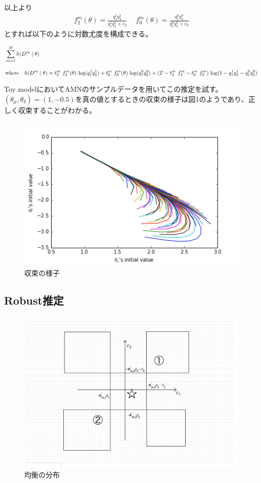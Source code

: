 \documentclass{jsarticle}
\begin{document}
以上より
\begin{align*}
	f_2^m(\theta) = \frac{q_1^1 q_2^1}{q_1^1 q_2^1+ c_2}\quad\ f_0^m(\theta) = \frac{q_1^0 q_2^0}{q_1^0 q_2^0+ c_0}
\end{align*}
とすれば以下のように対数尤度を構成できる。

\begin{align*}
	&\sum_{m = 1}^M h(D^m \mid \theta)\\[10pt]
	&\text{where}\quad h(D^m \mid \theta) = t_2^m\ f_2^m(\theta)\ {\rm log} (q_1^1 q_2^1) + t_0^m\ f_0^m(\theta)\ {\rm log} (q_1^0 q_2^0) + (T - t_2^m\ f_2^m - t_0^m\ f_0^m)\ {\rm log} (1- q_1^1 q_2^1 - q_1^0 q_2^0)
\end{align*}

Toy modelにおいてAMNのサンプルデータを用いてこの推定を試す。$(\theta_{\mu}, \theta_{\delta}) = (1, -0.5)$を真の値とするときの収束の様子は図1のようであり、正しく収束することがわかる。
\begin{figure}[h]
\centering
\includegraphics{conversion.png}
\caption{収束の様子}
\end{figure}

\subsection{Robust推定}
\begin{figure}[h]
\centering
\includegraphics[scale = 0.3]{brgraph.png}
\caption{均衡の分布}
\end{figure}
\end{document}

